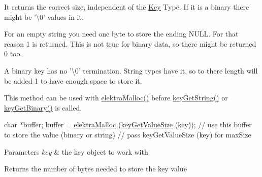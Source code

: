 It returns the correct size, independent of the \hyperlink{classkdb_1_1Key}{Key} Type. If it is a binary there might be '\textbackslash{}0' values in it.

For an empty string you need one byte to store the ending N\+U\+L\+L. For that reason 1 is returned. This is not true for binary data, so there might be returned 0 too.

A binary key has no '\textbackslash{}0' termination. String types have it, so to there length will be added 1 to have enough space to store it.

This method can be used with \hyperlink{internal_8c_a35cdc2e5caed3454cb73b4fc7f37858c}{elektra\+Malloc()} before \hyperlink{group__keyvalue_ga41b9fac5ccddafe407fc0ae1e2eb8778}{key\+Get\+String()} or \hyperlink{group__keyvalue_ga4c0d8a4a11174197699c231e0b5c3c84}{key\+Get\+Binary()} is called.


\begin{DoxyCode}
\textcolor{keywordtype}{char} *buffer;
buffer = \hyperlink{internal_8c_a35cdc2e5caed3454cb73b4fc7f37858c}{elektraMalloc} (\hyperlink{group__keyvalue_gae326672fffb7474abfe9baf53b73217e}{keyGetValueSize} (key));
\textcolor{comment}{// use this buffer to store the value (binary or string)}
\textcolor{comment}{// pass keyGetValueSize (key) for maxSize}
\end{DoxyCode}



\begin{DoxyParams}{Parameters}
{\em key} & the key object to work with \\
\hline
\end{DoxyParams}
\begin{DoxyReturn}{Returns}
the number of bytes needed to store the key value 
\end{DoxyReturn}

